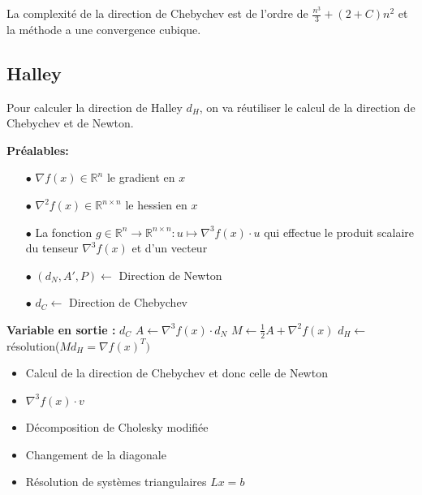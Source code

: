 La complexit\'e de la direction de Chebychev est de l'ordre de $\frac{n^3}{3}+(2+C)n^2$ et la m\'ethode a une convergence cubique.




\subsection{Halley}

Pour calculer la direction de Halley $d_H$, on va r\'eutiliser le calcul 
de la direction de Chebychev et de Newton. %

\begin{algorithm}                     %
\caption{Direction de Halley}          %
\label{alg:4}                           %
\begin{algorithmic}  
\STATE \textbf{Pr\'ealables:} %
\begin{itemize}
\item[$\bullet$] $\nabla f(x)\in \mathbb{R}^n$ le gradient en $x$
\item[$\bullet$] $\nabla^2 f(x)\in \mathbb{R}^{n\times n}$ le hessien en $x$
\item[$\bullet$] La fonction $g\in \mathbb{R}^{n} \rightarrow \mathbb{R}^{n\times n} : u \mapsto \nabla^3 f(x)\cdot u$ qui effectue
 le produit scalaire du tenseur $\nabla^3 f(x)$ et d'un vecteur
\item[$\bullet$] $(d_N,A',P)\leftarrow$ Direction de Newton
\item[$\bullet$] $d_C\leftarrow$ Direction de Chebychev

\end{itemize}

\STATE \textbf{Variable en sortie :} $d_C$
\STATE $A \leftarrow \nabla^3 f(x) \cdot d_N$
\STATE $M \leftarrow \frac{1}{2}A+\nabla^2 f(x)$
\STATE $d_H \leftarrow$ r\'esolution($Md_H=\nabla f(x)^T)$ 
\end{algorithmic}
\end{algorithm}



\begin{itemize}
\item Calcul de la direction de Chebychev et donc celle de Newton
\item $\nabla^3 f(x)\cdot v$
\item D\'ecomposition de Cholesky modifi\'ee
\item Changement de la diagonale
\item R\'esolution de syst\`emes triangulaires $Lx=b$ 
\end{itemize}



